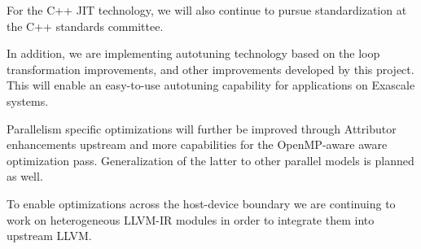 For the C++ JIT technology, we will also continue to pursue standardization at
the C++ standards committee.

In addition, we are implementing autotuning technology based on the loop
transformation improvements, and other improvements developed by this project.
This will enable an easy-to-use autotuning capability for applications on
Exascale systems.

Parallelism specific optimizations will further be improved through Attributor
enhancements upstream and more capabilities for the OpenMP-aware aware
optimization pass. Generalization of the latter to other parallel models is
planned as well.

To enable optimizations across the host-device boundary we are continuing to
work on heterogeneous LLVM-IR modules in order to integrate them into upstream
LLVM.


%
